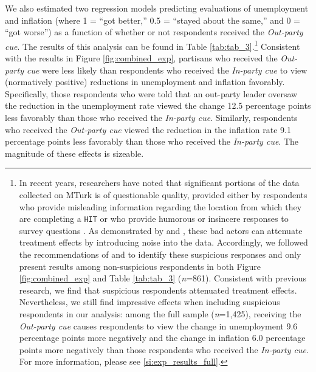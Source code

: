 \documentclass[12pt, letterpaper]{article}
\begin{document}
We also estimated two regression models predicting evaluations of unemployment and inflation (where 1 = ``got better,'' 0.5 = ``stayed about the same,'' and 0 = ``got worse'') as a function of whether or not respondents received the \textit{Out-party cue}. The results of this analysis can be found in Table \ref{tab:tab_3}.\footnote{In recent years, researchers have noted that significant portions of the data collected on MTurk is of questionable quality, provided either by respondents who provide misleading information regarding the location from which they are completing a \texttt{HIT} or who provide humorous or insincere responses to survey questions \citep[e.g.,][]{turk_paper,mturk_2019,bai_2018,dreyfuss_2018,kennedy2019shape,ryan_2018}. As demonstrated by  \citet{turk_paper} and \citet{kennedy2019shape}, these bad actors can attenuate treatment effects by introducing noise into the data. Accordingly, we followed the recommendations of \citet{turk_paper} and \citet{kennedy2019shape} to identify these suspicious responses and only present results among non-suspicious respondents in both Figure \ref{fig:combined_exp} and Table \ref{tab:tab_3} (\textit{n}=861). Consistent with previous research, we find that suspicious respondents attenuated treatment effects. Nevertheless, we still find impressive effects when including suspicious respondents in our analysis: among the full sample (\textit{n}=1,425), receiving the \textit{Out-party cue} causes respondents to view the change in unemployment 9.6 percentage points more negatively and the change in inflation 6.0 percentage points more negatively than those respondents who received the \textit{In-party cue}. For more information, please see \ref{si:exp_results_full}.} Consistent with the results in Figure \ref{fig:combined_exp}, partisans who received the \textit{Out-party cue} were less likely than respondents who received the \textit{In-party cue} to view (normatively positive) reductions in unemployment and inflation favorably. Specifically, those respondents who were told that an out-party leader oversaw the reduction in the unemployment rate viewed the change 12.5 percentage points less favorably than those who received the \textit{In-party cue}. Similarly, respondents who received the \textit{Out-party cue} viewed the reduction in the inflation rate 9.1 percentage points less favorably than those who received the \textit{In-party cue}. The magnitude of these effects is sizeable.


\end{document}
